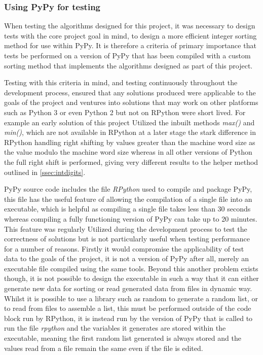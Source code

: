 \documentclass[12pt]{article}
\begin{document}
\subsubsection{Using PyPy for testing}
When testing the algorithms designed for this project, it was necessary to design tests with the core project goal in mind, to design a more efficient integer sorting method for use within PyPy. It is therefore a criteria of primary importance that tests be performed on a version of PyPy that has been compiled with a custom sorting method that implements the algorithms designed as part of this project. 
\par 
Testing with this criteria in mind, and testing continuously throughout the development process, ensured that any solutions produced were applicable to the goals of the project and ventures into solutions that may work on other platforms such as Python 3 or even Python 2 but not on RPython were short lived. For example an early solution of this project Utilized the inbuilt methods \textit{max()} and \textit{min()}, which are not available in RPython at a later stage the stark difference in RPython handling right shifting by values greater than the machine word size as the value modulo the machine word size whereas in all other versions of Python the full right shift is performed, giving very different results to the helper method outlined in \ref{ssec:intdigits}.
\par 
PyPy source code includes the file \textit{RPython} used to compile and package PyPy, this file has the useful feature of allowing the compilation of a single file into an executable, which is helpful as compiling a single file takes less than 30 seconds whereas compiling a fully functioning version of PyPy can take up to 20 minutes. This feature was regularly Utilized during the development process to test the correctness of solutions but is not particularly useful when testing performance for a number of reasons. Firstly it would compromise the applicability of test data to the goals of the project, it is not a version of PyPy after all, merely an executable file compiled using the same tools. Beyond this another problem exists though, it is not possible to design the executable in such a way that it can either generate new data for sorting or read generated data from files in dynamic way. Whilst it is possible to use a library such as random to generate a random list, or to read from files to assemble a list, this must be performed outside of the code block run by RPython, it is instead run by the version of PyPy that is called to run the file \textit{rpython} and the variables it generates are stored within the executable, meaning the first random list generated is always stored and the values read from a file remain the same even if the file is edited.
\pagebreak
\end{document}
